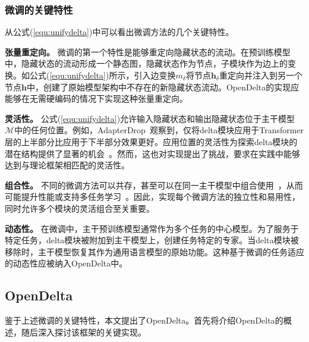 \subsubsection{微调的关键特性}

从公式(\ref{equ:unifydelta})中可以看出微调方法的几个关键特性。

\textbf{张量重定向。} 微调的第一个特性是能够重定向隐藏状态的流动。在预训练模型中，隐藏状态的流动形成一个静态图，隐藏状态作为节点，子模块作为边上的变换。如公式(\ref{equ:unifydelta})所示，引入边变换$m_\delta$将节点$\mathbf{h}_{\delta}$重定向并注入到另一个节点$\mathbf{h}$中，创建了原始模型架构中不存在的新隐藏状态流动。OpenDelta的实现应能够在无需硬编码的情况下实现这种张量重定向。

\textbf{灵活性。}
公式(\ref{equ:unifydelta})允许输入隐藏状态和输出隐藏状态位于主干模型$\mathcal{M}$中的任何位置。例如，AdapterDrop~\cite{ruckle-etal-2021-adapterdrop}观察到，仅将delta模块应用于Transformer层的上半部分比应用于下半部分效果更好。应用位置的灵活性为探索delta模块的潜在结构提供了显著的机会~\cite{hu2022sparse}。然而，这也对实现提出了挑战，要求在实践中能够达到与理论框架相匹配的灵活性。

\textbf{组合性。} 不同的微调方法可以共存，甚至可以在同一主干模型中组合使用~\cite{hu2022sparse}，从而可能提升性能或支持多任务学习~\cite{pfeiffer2020adapterfusion}。因此，实现每个微调方法的独立性和易用性，同时允许多个模块的灵活组合至关重要。

\textbf{动态性。} 在微调中，主干预训练模型通常作为多个任务的中心模型。为了服务于特定任务，delta模块被附加到主干模型上，创建任务特定的专家。当delta模块被移除时，主干模型恢复其作为通用语言模型的原始功能。这种基于微调的任务适应的动态性应被纳入OpenDelta中。


\subsection{OpenDelta}

鉴于上述微调的关键特性，本文提出了OpenDelta。首先将介绍OpenDelta的概述，随后深入探讨该框架的关键实现。


\begin{table*}
\centering
\caption{各参数高效微调方法在三种路由下的划分}
\label{tab:defaultconfig} 
\end{table*}

